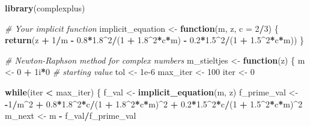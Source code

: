 \documentclass[
]{article}
\newenvironment{Shaded}{\begin{snugshade}}{\end{snugshade}}
\newcommand{\AttributeTok}[1]{\textcolor[rgb]{0.13,0.29,0.53}{#1}}
\newcommand{\CommentTok}[1]{\textcolor[rgb]{0.56,0.35,0.01}{\textit{#1}}}
\newcommand{\ControlFlowTok}[1]{\textcolor[rgb]{0.13,0.29,0.53}{\textbf{#1}}}
\newcommand{\DataTypeTok}[1]{\textcolor[rgb]{0.13,0.29,0.53}{#1}}
\newcommand{\DecValTok}[1]{\textcolor[rgb]{0.00,0.00,0.81}{#1}}
\newcommand{\FloatTok}[1]{\textcolor[rgb]{0.00,0.00,0.81}{#1}}
\newcommand{\FunctionTok}[1]{\textcolor[rgb]{0.13,0.29,0.53}{\textbf{#1}}}
\newcommand{\NormalTok}[1]{#1}
\newcommand{\OtherTok}[1]{\textcolor[rgb]{0.56,0.35,0.01}{#1}}
\newcommand{\SpecialCharTok}[1]{\textcolor[rgb]{0.81,0.36,0.00}{\textbf{#1}}}
\begin{document}
\begin{Shaded}
\begin{Highlighting}[]
\FunctionTok{library}\NormalTok{(complexplus)}

\CommentTok{\# Your implicit function}
\NormalTok{implicit\_equation }\OtherTok{\textless{}{-}} \ControlFlowTok{function}\NormalTok{(m, z, }\AttributeTok{c =} \DecValTok{2}\SpecialCharTok{/}\DecValTok{3}\NormalTok{) \{}
  \FunctionTok{return}\NormalTok{(z }\SpecialCharTok{+} \DecValTok{1}\SpecialCharTok{/}\NormalTok{m }\SpecialCharTok{{-}} \FloatTok{0.8}\SpecialCharTok{*}\FloatTok{1.8}\SpecialCharTok{\^{}}\DecValTok{2}\SpecialCharTok{/}\NormalTok{(}\DecValTok{1} \SpecialCharTok{+} \FloatTok{1.8}\SpecialCharTok{\^{}}\DecValTok{2}\SpecialCharTok{*}\NormalTok{c}\SpecialCharTok{*}\NormalTok{m) }\SpecialCharTok{{-}} \FloatTok{0.2}\SpecialCharTok{*}\FloatTok{1.5}\SpecialCharTok{\^{}}\DecValTok{2}\SpecialCharTok{/}\NormalTok{(}\DecValTok{1} \SpecialCharTok{+} \FloatTok{1.5}\SpecialCharTok{\^{}}\DecValTok{2}\SpecialCharTok{*}\NormalTok{c}\SpecialCharTok{*}\NormalTok{m))}
\NormalTok{\}}

\CommentTok{\# Newton{-}Raphson method for complex numbers}
\NormalTok{m\_stieltjes }\OtherTok{\textless{}{-}} \ControlFlowTok{function}\NormalTok{(z) \{}
\NormalTok{  m }\OtherTok{\textless{}{-}} \DecValTok{0} \SpecialCharTok{+} \DecValTok{1}\DataTypeTok{i}\SpecialCharTok{*}\DecValTok{0}  \CommentTok{\# starting value}
\NormalTok{  tol }\OtherTok{\textless{}{-}} \FloatTok{1e{-}6}
\NormalTok{  max\_iter }\OtherTok{\textless{}{-}} \DecValTok{100}
\NormalTok{  iter }\OtherTok{\textless{}{-}} \DecValTok{0}
  
  \ControlFlowTok{while}\NormalTok{(iter }\SpecialCharTok{\textless{}}\NormalTok{ max\_iter) \{}
\NormalTok{    f\_val }\OtherTok{\textless{}{-}} \FunctionTok{implicit\_equation}\NormalTok{(m, z)}
\NormalTok{    f\_prime\_val }\OtherTok{\textless{}{-}} \SpecialCharTok{{-}}\DecValTok{1}\SpecialCharTok{/}\NormalTok{m}\SpecialCharTok{\^{}}\DecValTok{2} \SpecialCharTok{+} \FloatTok{0.8}\SpecialCharTok{*}\FloatTok{1.8}\SpecialCharTok{\^{}}\DecValTok{2}\SpecialCharTok{*}\NormalTok{c}\SpecialCharTok{/}\NormalTok{(}\DecValTok{1} \SpecialCharTok{+} \FloatTok{1.8}\SpecialCharTok{\^{}}\DecValTok{2}\SpecialCharTok{*}\NormalTok{c}\SpecialCharTok{*}\NormalTok{m)}\SpecialCharTok{\^{}}\DecValTok{2} \SpecialCharTok{+} \FloatTok{0.2}\SpecialCharTok{*}\FloatTok{1.5}\SpecialCharTok{\^{}}\DecValTok{2}\SpecialCharTok{*}\NormalTok{c}\SpecialCharTok{/}\NormalTok{(}\DecValTok{1} \SpecialCharTok{+} \FloatTok{1.5}\SpecialCharTok{\^{}}\DecValTok{2}\SpecialCharTok{*}\NormalTok{c}\SpecialCharTok{*}\NormalTok{m)}\SpecialCharTok{\^{}}\DecValTok{2}
\NormalTok{    m\_next }\OtherTok{\textless{}{-}}\NormalTok{ m }\SpecialCharTok{{-}}\NormalTok{ f\_val}\SpecialCharTok{/}\NormalTok{f\_prime\_val}
    

\end{Highlighting}
\end{Shaded}
\end{document}
